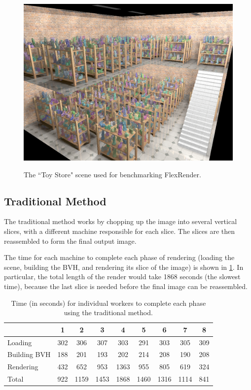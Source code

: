 \documentclass[12pt]{ucthesis}
\newcommand{\captionfonts}{\small\bf\ssp}
\begin{document}
\begin{figure}[h!]
    \centering
    \includegraphics[width=140mm]{images/toystore.png}
    \captionfonts
    \caption{The ``Toy Store" scene used for benchmarking FlexRender.}
    \label{fig:toystore}
\end{figure}

\subsection{Traditional Method}
\label{toystoretraditional}

The traditional method works by chopping up the image into several vertical
slices, with a different machine responsible for each slice. The slices are
then reassembled to form the final output image.

The time for each machine to complete each phase of rendering (loading the
scene, building the BVH, and rendering its slice of the image) is shown
in \ref{tb:traditionaltimes}. In particular, the total length of the render
would take 1868 seconds (the slowest time), because the last slice is needed
before the final image can be reassembled.

\begin{table}
\begin{center}
\begin{tabular}{|l||c|c|c|c|c|c|c|c|}
    \hline
    & 1 & 2 & 3 & 4 & 5 & 6 & 7 & 8 \\
    \hline
    \hline
    Loading & 302 & 306 & 307 & 303 & 291 & 303 & 305 & 309 \\
    \hline
    Building BVH & 188 & 201 & 193 & 202 & 214 & 208 & 190 & 208 \\
    \hline
    Rendering & 432 & 652 & 953 & 1363 & 955 & 805 & 619 & 324 \\
    \hline
    \hline
    Total & 922 & 1159 & 1453 & 1868 & 1460 & 1316 & 1114 & 841 \\
    \hline
\end{tabular}
\caption{Time (in seconds) for individual workers to complete each phase using the traditional method.}
\label{tb:traditionaltimes}
\end{center}
\end{table}
\end{document}
